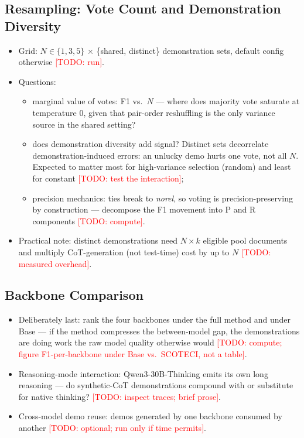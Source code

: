 \documentclass[11pt]{article}
\newcommand{\todo}[1]{\textcolor{red}{[TODO: #1]}}
\newcommand{\method}{SCOTECI}
\begin{document}
\subsection{Resampling: Vote Count and Demonstration Diversity}
\label{sec:ablations-resampling}
\begin{itemize}
  \item Grid: $N \in \{1, 3, 5\}$ $\times$ \{shared, distinct\} demonstration
        sets, default config otherwise \todo{run}.
  \item Questions:
        \begin{itemize}
          \item marginal value of votes: F1 vs.\ $N$ --- where does majority
                vote saturate at temperature 0, given that pair-order
                reshuffling is the only variance source in the shared setting?
          \item does demonstration diversity add signal? Distinct sets
                decorrelate demonstration-induced errors: an unlucky demo hurts
                one vote, not all $N$. Expected to matter most for
                high-variance selection (random) and least for constant
                \todo{test the interaction};
          \item precision mechanics: ties break to \textit{norel}, so voting
                is precision-preserving by construction --- decompose the F1
                movement into P and R components \todo{compute}.
        \end{itemize}
  \item Practical note: distinct demonstrations need $N \times k$ eligible
        pool documents and multiply CoT-generation (not test-time) cost by up
        to $N$ \todo{measured overhead}.
\end{itemize}

\subsection{Backbone Comparison}
\label{sec:ablations-models}
\begin{itemize}
  \item Deliberately last: rank the four backbones under the full method and
        under Base --- if the method compresses the between-model gap, the
        demonstrations are doing work the raw model quality otherwise would
        \todo{compute; figure F1-per-backbone under Base vs.\ \method{},
        not a table}.
  \item Reasoning-mode interaction: Qwen3-30B-Thinking emits its own long
        reasoning --- do synthetic-CoT demonstrations compound with or
        substitute for native thinking? \todo{inspect traces; brief prose}.
  \item Cross-model demo reuse: demos generated by one backbone consumed by
        another \todo{optional; run only if time permits}.
\end{itemize}
\end{document}
